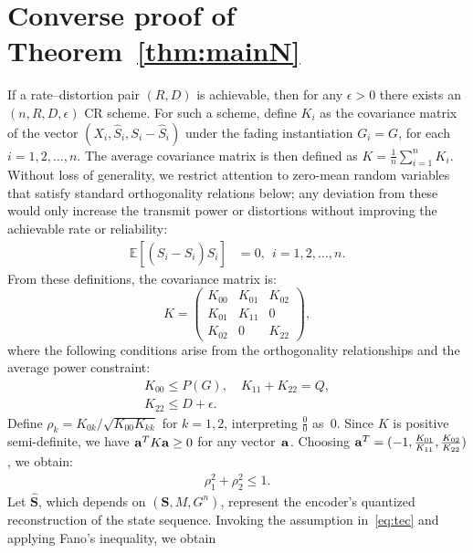 \documentclass[journal]{IEEEtran}
\def\eE{\mathbb E}
\def\eE{\mathbb E}
\def\bS{\mathbf S}
\def\bhS{\hat{\mathbf S}}
\def\bhS{\hat{\mathbf S}}
\def\va{\boldsymbol{\alpha}}
\begin{document}
\section{Converse proof of Theorem~\ref{thm:mainN}} \label{sec:conv}
\def\va{\boldsymbol{\alpha}}%

\def\neps{n \epsilon_n}
If a rate–distortion pair $(R,D)$ is achievable, then for any $\epsilon > 0$ there exists an $(n,R,D,\epsilon)$ CR scheme.
For such a scheme, define $K_i$ as the covariance matrix of the vector $(X_i,\hat{S}_{i},S_i-\hat{S}_{i})$ under the fading instantiation $G_i=G$, for each $i=1,2,\ldots,n$. The average covariance matrix is then defined as $K=\frac{1}{n}\sum_{i=1}^{n}K_i$. Without loss of generality, we restrict attention to zero-mean random variables that satisfy standard orthogonality relations below; any deviation from these would only increase the transmit power or distortions without improving the achievable rate or reliability:
\begin{align*}
\eE [ (S_i-\hat{S}_{i})\hat{S}_{i} ] &= 0, \:\: i=1,2,\ldots,n.
\end{align*}
From these definitions, the covariance matrix is:
\begin{equation}
    K =
    \left(
    \begin{array}{ccc}
        K_{00} & K_{01} & K_{02}\\
        K_{01} & K_{11} & 0\\
        K_{02} & 0 & K_{22}
    \end{array}
    \right), \label{eq:Kconverse}
\end{equation}
where the following conditions arise from the orthogonality relationships and the average power constraint:
\begin{gather}
    K_{00} \leq P(G), \quad K_{11} + K_{22} = Q, \label{eq:ConverseConditions1}\\
    K_{22} \leq D + \epsilon. \label{eq:ConverseConditions2}
\end{gather}
Define $\rho_k = K_{0k}/\sqrt{K_{00}K_{kk}}$ for $k = 1,2$, interpreting $\tfrac{0}{0}$ as~0. 
Since $K$ is positive semi-definite, we have ${\bf a}^T K {\bf a} \geq 0$ for any vector~${\bf a}$. 
Choosing ${\bf a}^T = (-1, \tfrac{K_{01}}{K_{11}}, \tfrac{K_{02}}{K_{22}})$, we obtain:
\begin{align}
    \rho_1^2 + \rho_2^2 \leq 1. \label{eq:ConverseConditions5}
\end{align}
Let $\bhS$, which depends on $(\bS, M, G^n)$, represent the encoder’s quantized reconstruction of the state sequence. Invoking the assumption in~\eqref{eq:tec} and applying Fano’s inequality, we obtain
\end{document}
